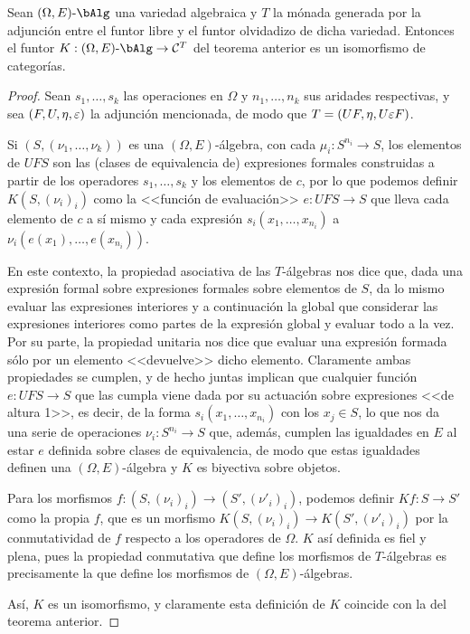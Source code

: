 \begin{proposition}
  Sean $(\Omega,E)\dash\bAlg$ una variedad algebraica y $T$ la mónada generada
  por la adjunción entre el funtor libre y el funtor olvidadizo de dicha
  variedad. Entonces el funtor $K:(\Omega,E)\dash\bAlg\to\cC^T$ del teorema
  anterior es un isomorfismo de categorías.
\end{proposition}
\begin{proof}
  Sean $s_1,\dots,s_k$ las operaciones en $\Omega$ y $n_1,\dots,n_k$ sus
  aridades respectivas, y sea $(F,U,\eta,\varepsilon)$ la adjunción mencionada, de modo
  que $T=(UF,\eta,U\varepsilon F)$.

  Si $(S,(\nu_1,\dots,\nu_k))$ es una $(\Omega,E)$-álgebra, con cada
  $\mu_i:S^{n_i}\to S$, los elementos de $UFS$ son las (clases de equivalencia
  de) expresiones formales construidas a partir de los operadores
  $s_1,\dots,s_k$ y los elementos de $c$, por lo que podemos definir
  $K(S,(\nu_i)_i)$ como la <<función de evaluación>> $e:UFS\to S$ que lleva cada
  elemento de $c$ a sí mismo y cada expresión $s_i(x_1,\dots,x_{n_i})$ a
  $\nu_i(e(x_1),\dots,e(x_{n_i}))$.

  En este contexto, la propiedad asociativa de las $T$-álgebras nos dice que,
  dada una expresión formal sobre expresiones formales sobre elementos de $S$,
  da lo mismo evaluar las expresiones interiores y a continuación la global que
  considerar las expresiones interiores como partes de la expresión global y
  evaluar todo a la vez.  Por su parte, la propiedad unitaria nos dice que
  evaluar una expresión formada sólo por un elemento <<devuelve>> dicho
  elemento. Claramente ambas propiedades se cumplen, y de hecho juntas implican
  que cualquier función $e:UFS\to S$ que las cumpla viene dada por su actuación
  sobre expresiones <<de altura 1>>, es decir, de la forma
  $s_i(x_1,\dots,x_{n_i})$ con los $x_j\in S$, lo que nos da una serie de
  operaciones $\nu_i:S^{n_i}\to S$ que, además, cumplen las igualdades en $E$ al
  estar $e$ definida sobre clases de equivalencia, de modo que estas igualdades
  definen una $(\Omega,E)$-álgebra y $K$ es biyectiva sobre objetos.

  Para los morfismos $f:(S,(\nu_i)_i)\to(S',(\nu'_i)_i)$, podemos definir
  $Kf:S\to S'$ como la propia $f$, que es un morfismo
  $K(S,(\nu_i)_i)\to K(S',(\nu'_i)_i)$ por la conmutatividad de $f$ respecto a
  los operadores de $\Omega$. $K$ así definida es fiel y plena, pues la
  propiedad conmutativa que define los morfismos de $T$-álgebras es precisamente
  la que define los morfismos de $(\Omega,E)$-álgebras.

  Así, $K$ es un isomorfismo, y claramente esta definición de $K$ coincide con
  la del teorema anterior.
\end{proof}

